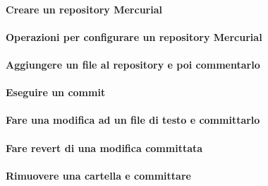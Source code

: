 \documentclass[a4paper]{article}
\begin{document}
	\paragraph{Creare un repository Mercurial}
	
	\paragraph{Operazioni per configurare un repository Mercurial}
	
	\paragraph{Aggiungere un file al repository e poi commentarlo}	
	
	\paragraph{Eseguire un commit}
	
	\paragraph{Fare una modifica ad un file di testo e committarlo}
	
	\paragraph{Fare revert di una modifica committata}
	
	\paragraph{Rimuovere una cartella e committare}
	
	
	
\end{document}
